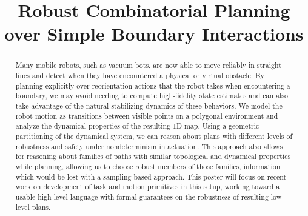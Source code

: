 \documentclass[conference]{IEEEtran}
\begin{document}
\title{Robust Combinatorial Planning \\ over Simple Boundary Interactions}

\author{
\and
{}
}


\maketitle

\begin{abstract}
Many mobile robots, such as vacuum bots, are now able to move reliably in
straight lines and detect when they have encountered a physical or virtual
obstacle. By planning explicitly over reorientation actions that the robot takes when
encountering a boundary, we may avoid needing to compute high-fidelity state
estimates and can also take advantage of the natural stabilizing dynamics of
these behaviors. We model the robot motion as transitions between visible
points on a polygonal environment and analyze the dynamical properties of the
resulting 1D map. Using a geometric partitioning of the dynamical system, we can
reason about plans with different levels of robustness and safety under 
nondeterminism in actuation. This approach also allows for reasoning about 
families of paths with similar topological and dynamical properties while
planning, allowing us to choose robust members of those families, information which would be lost with a sampling-based approach.
This poster will focus on recent work on development of task and motion primitives in this setup,
working toward a usable high-level language with formal guarantees on the
robustness of resulting low-level plans.
\end{abstract}
\end{document}
